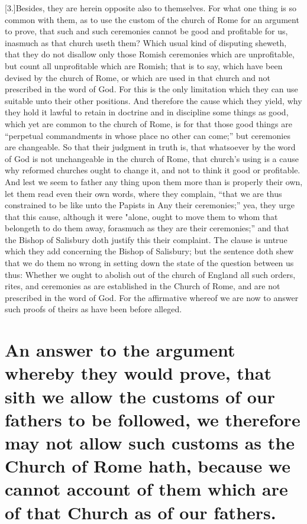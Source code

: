 [3.]Besides, they are herein opposite also to themselves. For what one thing is so common with them, as to use the custom of the church of Rome for an argument to prove, that such and such ceremonies cannot be good and profitable for us, inasmuch as that church useth them? Which usual kind of disputing sheweth, that they do not disallow only those Romish ceremonies which are unprofitable, but count all unprofitable which are Romish; that is to say, which have been devised by the church of Rome, or which are used in that church and not prescribed in the word of God. For this is the only limitation which they can use suitable unto their other positions. And therefore the cause which they yield, why they hold it lawful to retain in doctrine and in discipline some things as good, which yet are common to the church of Rome, is for that those good things are “perpetual commandments in whose place no other can come;” but ceremonies are changeable. So that their judgment in truth is, that whatsoever by the word of God is not unchangeable in the church of Rome, that church’s using is a cause why reformed churches ought to change it, and not to think it good or profitable. And lest we seem to father any thing upon them more than is properly their own, let them read even their own words, where they complain, “that we are thus constrained to be like unto the Papists in Any their ceremonies;” yea, they urge that this cause, although it were "alone, ought to move them to whom that belongeth to do them away, forasmuch as they are their ceremonies;” and that the Bishop of Salisbury doth justify this their complaint.  The clause is untrue which they add concerning the Bishop of Salisbury; but the sentence doth shew that we do them no wrong in setting down the state of the question between us thus: Whether we ought to abolish out of the church of England all such orders, rites, and ceremonies as are established in the Church of Rome, and are not prescribed in the word of God. For the affirmative whereof we are now to answer such proofs of theirs as have been before alleged.

\section*{An answer to the argument whereby they would prove, that sith we allow the customs of our fathers to be followed, we therefore may not allow such customs as the Church of Rome hath, because we cannot account of them which are of that Church as of our fathers.}

